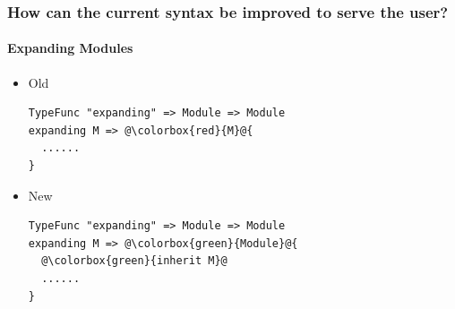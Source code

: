 \documentclass[xetex,serif,aspectratio=169]{beamer}
\begin{document}



\begin{frame}[fragile]
   \frametitle{How can the current syntax be improved to serve the user?}
   \framesubtitle{Expanding Modules}

   \begin{itemize}
      \item Old
         \begin{lstlisting}[escapechar=@]
TypeFunc "expanding" => Module => Module
expanding M => @\colorbox{red}{M}@{
  ......
}
         \end{lstlisting}

      \item New
         \begin{lstlisting}[escapechar=@]
TypeFunc "expanding" => Module => Module
expanding M => @\colorbox{green}{Module}@{
  @\colorbox{green}{inherit M}@
  ......
}
         \end{lstlisting}
   \end{itemize}
\end{frame}
\end{document}
